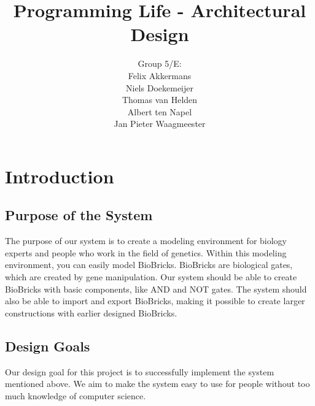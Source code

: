 \documentclass[a4paper]{article}
\title{Programming Life - Architectural Design }
\author{Group 5/E:\\
Felix Akkermans \\
Niels Doekemeijer \\
Thomas van Helden \\
Albert ten Napel \\
Jan Pieter Waagmeester}
\begin{document}
\maketitle

\vfill

\small{\tableofcontents}
\pagebreak
\section{Introduction}
\subsection{Purpose of the System}
The purpose of our system is to create a modeling environment for biology experts and people who work in the field of genetics. Within this modeling environment, you can easily model BioBricks. BioBricks are biological gates, which are created by gene manipulation. Our system should be able to create BioBricks with basic components, like AND and NOT gates. The system should also be able to import and export BioBricks, making it possible to create larger constructions with earlier designed BioBricks.

\subsection{Design Goals}
Our design goal for this project is to successfully implement the system mentioned above. We aim to make the system easy to use for people without too much knowledge of computer science.
\end{document}
